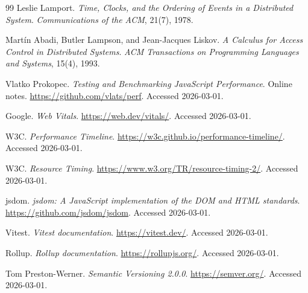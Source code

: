 \documentclass[11pt,oneside]{book}
\begin{document}
\begin{thebibliography}{99}
Leslie Lamport.
\emph{Time, Clocks, and the Ordering of Events in a Distributed System}.
\emph{Communications of the ACM}, 21(7), 1978.

Mart\'in Abadi, Butler Lampson, and Jean-Jacques Liskov.
\emph{A Calculus for Access Control in Distributed Systems}.
\emph{ACM Transactions on Programming Languages and Systems}, 15(4), 1993.

Vlatko Prokopec.
\emph{Testing and Benchmarking JavaScript Performance}.
Online notes.
\url{https://github.com/vlats/perf}.
Accessed 2026-03-01.

Google.
\emph{Web Vitals}.
\url{https://web.dev/vitals/}.
Accessed 2026-03-01.

W3C.
\emph{Performance Timeline}.
\url{https://w3c.github.io/performance-timeline/}.
Accessed 2026-03-01.

W3C.
\emph{Resource Timing}.
\url{https://www.w3.org/TR/resource-timing-2/}.
Accessed 2026-03-01.

jsdom.
\emph{jsdom: A JavaScript implementation of the DOM and HTML standards}.
\url{https://github.com/jsdom/jsdom}.
Accessed 2026-03-01.

Vitest.
\emph{Vitest documentation}.
\url{https://vitest.dev/}.
Accessed 2026-03-01.

Rollup.
\emph{Rollup documentation}.
\url{https://rollupjs.org/}.
Accessed 2026-03-01.

Tom Preston-Werner.
\emph{Semantic Versioning 2.0.0}.
\url{https://semver.org/}.
Accessed 2026-03-01.

\end{thebibliography}
\end{document}
